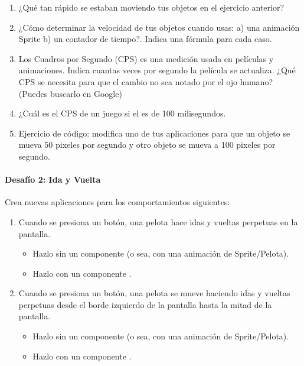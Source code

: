 \begin{enumerate}

\item ¿Qué tan rápido se estaban moviendo tus objetos en el ejercicio
anterior?

\item ¿Cómo determinar la velocidad de tus objetos cuando usas: a) una
  animación Sprite b) un contador de tiempo?. Indica una fórmula para
  cada caso.

\item Los Cuadros por Segundo (CPS) es una medición usada en películas
  y animaciones. Indica cuantas veces por segundo la película se
  actualiza.  ¿Qué CPS se necesita para que el cambio no sea notado
  por el ojo humano?  (Puedes buscarlo en Google)

\item ¿Cuál es el CPS de un juego si el
   es de 100 milisegundos.

\item Ejercicio de código: modifica uno de tus aplicaciones para que
  un objeto se mueva 50 pixeles por segundo y otro objeto se mueva a
  100 pixeles por segundo.

\end{enumerate}

\paragraph{Desafío 2: Ida y Vuelta }

Crea nuevas aplicaciones para los comportamientos siguientes:

\begin{enumerate}

\item Cuando se presiona un botón, una pelota hace idas y vueltas
  perpetuas en la pantalla.

  \begin{itemize}
  \item Hazlo sin un componente  (o sea, con una
    animación de Sprite/Pelota).

  \item Hazlo con un componente .
  \end{itemize}

\item Cuando se presiona un botón, una pelota se mueve haciendo idas y
  vueltas perpetuas desde el borde izquierdo de la pantalla hasta la
  mitad de la pantalla.

  \begin{itemize}
  \item Hazlo sin un componente  (o sea, con una
    animación de Sprite/Pelota).

  \item Hazlo con un componente .
  \end{itemize}

\end{enumerate}

